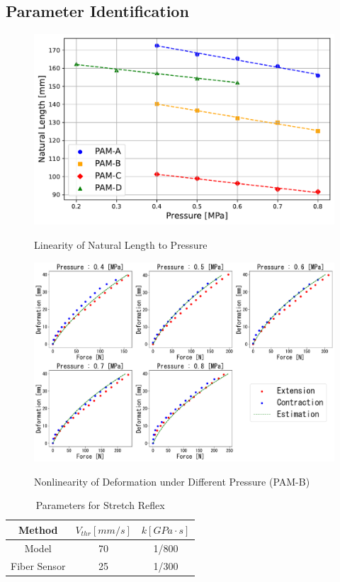 \subsection{Parameter Identification}
\begin{figure}[t]
    \hfill
    \begin{minipage}{\columnwidth}
        \centering
        \includegraphics[width=\columnwidth]{fig/length_pressure.pdf} 
        \caption{Linearity of Natural Length to Pressure}
        \label{fig:length_pressure}
        \vspace{1em} 
        \includegraphics[width=\columnwidth]{fig/20231124_5_4s_2d_ieeesensors1.pdf}
        \caption{Nonlinearity of Deformation under Different Pressure (PAM-B)}
        \label{fig:pam_b_static1}
    \end{minipage}
\end{figure}
\begin{table}[t]
    \centering
    \caption{Parameters for Stretch Reflex} 
    \begin{tabular}{c|cc}
        \hline
        Method &$V_{thr} [\si{mm/s}]$&$ k [\si{GPa\cdot s}]$\\
        \hline \hline
        Model & 70 & 1/800\\
        Fiber Sensor & 25 & 1/300\\
        \hline
    \end{tabular}
\label{tab:reflex_para}
\end{table}
